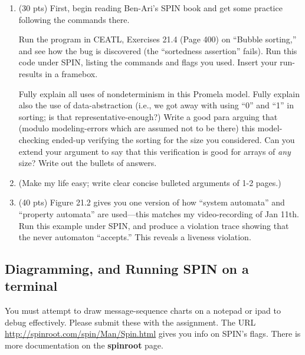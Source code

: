 \documentclass[11pt]{article}
\begin{document}
\begin{enumerate}
\item (30 pts) First, begin reading Ben-Ari's SPIN book and get some practice
  following the commands there.

  Run the program in CEATL, Exercises
  21.4 (Page 400) on ``Bubble sorting,'' and see how the bug is discovered
  (the ``sortedness assertion'' fails).
  Run this code under SPIN, listing the commands and flags you used.
  Insert your run-results in a framebox.
  
  Fully explain all uses of nondeterminism in this Promela model.
  Fully explain also the use of data-abstraction (i.e., we got away with
  using ``0'' and ``1'' in sorting; is that representative-enough?)
  Write a good para arguing that (modulo modeling-errors which are assumed
  not to be there) this model-checking ended-up verifying the sorting for the size
  you considered.
  Can you extend your argument to say that this verification is good for
  arrays of {\em any} size? Write out the bullets of answers.
  
  \item[] (Make my life easy; write clear concise bulleted arguments of 1-2 pages.)

    \clearpage
  
  \item (40 pts) Figure 21.2 gives you one version of how ``system automata''
    and ``property automata'' are used---this matches my video-recording
    of Jan 11th.
    Run this example under SPIN, and produce a violation trace showing that
    the never automaton ``accepts.'' This reveals a liveness violation.
\end{enumerate}

    \clearpage
    
\subsection*{Diagramming, and Running SPIN on a terminal}

You must attempt to draw message-sequence charts on a notepad or ipad to debug effectively.
Please submit these with the assignment.
The URL \url{http://spinroot.com/spin/Man/Spin.html} gives you info on SPIN's flags.
There is more documentation on the {\bf spinroot} page.
\end{document}
